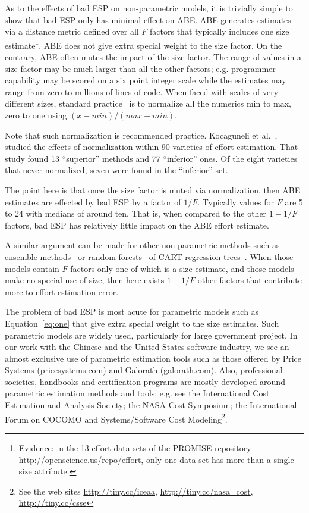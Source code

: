 \documentclass[final,twocolumn]{elsarticle}
\newcommand{\eq}[1]{Equation~\ref{eq:#1}}
\theoremstyle{break}
\begin{document}
As to the effects of bad ESP on  non-parametric models, it is
 trivially simple to show that bad ESP only has minimal effect on ABE.
 ABE generates estimates via a distance metric
 defined over all $F$ factors that typically includes one size estimate\footnote{Evidence:
   in the 13  effort data sets of the PROMISE repository http://openscience.us/repo/effort, only one data set has more than a single
   size attribute.}. ABE does not give extra special weight to the size factor.
 On the contrary, ABE often mutes the impact of the size factor.
The range of values in a size factor may be much larger than all the other factors; e.g. programmer
 capability may be scored on a six point integer scale while the estimates may
 range from zero to millions of lines of code. When faced with scales of very
 different sizes, standard practice~\cite{koc11b,aha1991instance} is to
 normalize all the numerics min to max, zero to one using
 \mbox{$(x-\mathit{min})/(\mathit{max} - \mathit{min})$}.

  Note that such normalization is recommended practice. 
 Kocaguneli et al.~\cite{Kocaguneli2012z}, studied the effects of  normalization
 within 90 varieties of effort estimation. That study found 13 ``superior''
 methods and 77 ``inferior'' ones. Of the eight varieties that never normalized,
 seven were found in the ``inferior'' set.

 The point here is that once the size factor is muted via normalization,
  then ABE estimates are effected by bad ESP by a factor of
   $1/F$. Typically values for $F$ are 5 to 24
  with medians of around ten. That is, when compared to the other $1-1/F$ factors,  bad ESP has relatively
  little impact on the ABE effort estimate.
 
A similar argument can be made for other non-parametric methods such as ensemble
methods~\cite{Kocaguneli2012z} or random forests~\cite{breiman2001random} of
CART regression trees~\cite{breiman1984classification}. When those models contain
$F$ factors only one of which is a size estimate, and those models make no
special use of size, then here exists $1-1/F$ other factors that contribute more
to effort estimation error.

The problem of bad ESP is most acute for parametric models such as \eq{one} that give
extra special weight to the size estimates.
Such parametric models are widely used, particularly for large government project.
In our work with the Chinese and the United States software industry,
we see an   almost exclusive
use  of parametric estimation tools such as those offered by 
Price Systems (pricesystems.com) and  Galorath (galorath.com).
Also,
professional societies, handbooks and
certification programs are mostly developed around 
parametric estimation methods and tools; e.g. see the 
International Cost Estimation and Analysis Society; the
NASA Cost Symposium;  the
International Forum on COCOMO and Systems/Software
Cost Modeling\footnote{See the web sites \url{http://tiny.cc/iceaa}, \url{http://tiny.cc/nasa_cost}, \url{http://tiny.cc/csse}}.
\end{document}
